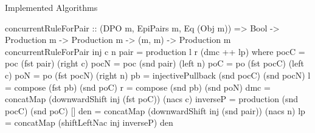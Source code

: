\documentclass[xcolor=dvipsnames,pdf,11pt,handout]{beamer}
\begin{document}
\begin{frame}[fragile]{Implemented Algorithms}{}
\begin{haskell}
concurrentRuleForPair :: (DPO m, EpiPairs m, Eq (Obj m)) => Bool -> Production m -> Production m -> (m, m) -> Production m
concurrentRuleForPair inj c n pair = production l r (dmc ++ lp)
  where
    pocC = poc (fst pair) (right c)
    pocN = poc (snd pair) (left n)
    poC = po (fst pocC) (left c)
    poN = po (fst pocN) (right n)
    pb = injectivePullback (snd pocC) (snd pocN)
    l = compose (fst pb) (snd poC)
    r = compose (snd pb) (snd poN)
    dmc = concatMap (downwardShift inj (fst poC)) (nacs c)
    inverseP = production (snd pocC) (snd poC) []
    den = concatMap (downwardShift inj (snd pair)) (nacs n)
    lp = concatMap (shiftLeftNac inj inverseP) den
\end{haskell}
\end{frame}
\end{document}
